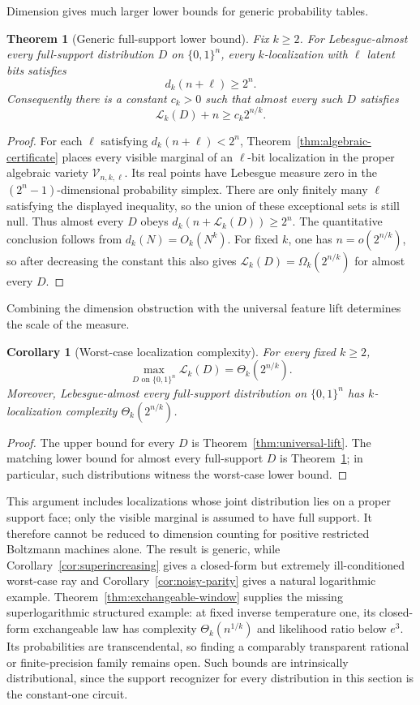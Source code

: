 \documentclass{article}
\newcommand{\LC}{\mathcal{L}}
\newcommand{\bits}{\{0,1\}}
\newtheorem{theorem}{Theorem}
\newtheorem{corollary}{Corollary}
\begin{document}
Dimension gives much larger lower bounds for generic probability tables.

\begin{theorem}[Generic full-support lower bound]
\label{thm:generic-positive}
Fix $k\ge2$.  For Lebesgue-almost every full-support distribution $D$ on
$\bits^n$, every $k$-localization with $\ell$ latent bits satisfies
\[
  d_k(n+\ell)\ge2^n.
\]
Consequently there is a constant $c_k>0$ such that almost every such $D$
satisfies
\[
  \LC_k(D)+n\ge c_k2^{n/k}.
\]
\end{theorem}

\begin{proof}
For each $\ell$ satisfying $d_k(n+\ell)<2^n$,
Theorem~\ref{thm:algebraic-certificate} places every visible marginal of an
$\ell$-bit localization in the proper algebraic variety
$\mathcal V_{n,k,\ell}$.  Its real points have Lebesgue measure zero in the
$(2^n-1)$-dimensional probability simplex.  There are only finitely many
$\ell$ satisfying the displayed inequality, so the union of these exceptional
sets is still null.  Thus almost every $D$ obeys
$d_k(n+\LC_k(D))\ge2^n$.  The quantitative conclusion follows from
$d_k(N)=O_k(N^k)$.  For fixed $k$, one has $n=o(2^{n/k})$, so after
decreasing the constant this also gives
$\LC_k(D)=\Omega_k(2^{n/k})$ for almost every $D$.
\end{proof}

Combining the dimension obstruction with the universal feature lift determines
the scale of the measure.

\begin{corollary}[Worst-case localization complexity]
\label{cor:worst-case}
For every fixed $k\ge2$,
\[
  \max_{D\text{ on }\bits^n}\LC_k(D)=\Theta_k(2^{n/k}).
\]
Moreover, Lebesgue-almost every full-support distribution on $\bits^n$ has
$k$-localization complexity $\Theta_k(2^{n/k})$.
\end{corollary}

\begin{proof}
The upper bound for every $D$ is Theorem~\ref{thm:universal-lift}.  The matching
lower bound for almost every full-support $D$ is
Theorem~\ref{thm:generic-positive}; in particular, such distributions witness
the worst-case lower bound.
\end{proof}

This argument includes localizations whose joint distribution lies on a
proper support face; only the visible marginal is assumed to have full support.
It therefore cannot be reduced to dimension counting for positive restricted
Boltzmann machines alone.  The result is generic, while
Corollary~\ref{cor:superincreasing} gives a closed-form but extremely
ill-conditioned worst-case ray and Corollary~\ref{cor:noisy-parity} gives a
natural logarithmic example.  Theorem~\ref{thm:exchangeable-window} supplies
the missing superlogarithmic structured example: at fixed inverse temperature
one, its closed-form exchangeable law has complexity
$\Theta_k(n^{1/k})$ and likelihood ratio below $e^3$.  Its probabilities are
transcendental, so finding a comparably transparent rational or finite-precision
family remains open.  Such bounds are intrinsically distributional, since the
support recognizer for every distribution in this section is the constant-one
circuit.
\end{document}
